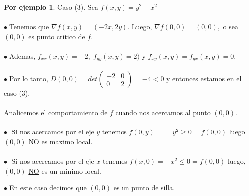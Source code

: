 \documentclass{article}
\theoremstyle{definition}
\newtheorem*{ej}{Por ejemplo}
\theoremstyle{remark}
\newcommand\bl{$\bullet\;$}
\begin{document}
\begin{ej} Caso \textcolor{rojop2}{(3)}. Sea $f(x,y)=y^2-x^2$\\\\
  \bl Tenemos que $\nabla f(x,y)=(-2x,2y)$. Luego, $\nabla f (0,0)=(0,0),$ o sea $(0,0)$ es punto critico de $f$. \\\\
   \bl Ademas, $f_{xx}(x,y)=-2, \; f_{yy}(x,y)=2)$ \; y \; $f_{xy}(x,y)=f_{yx}(x,y)=0$. \\\\
   \bl Por lo tanto, $D(0,0)=det\left(\begin{array}{rl}
       -2 & 0 \\
       0 & 2
   \end{array}\right)=-4<0$ y entonces estamos en el caso \textcolor{rojop2}{(3)}. \\\\
   Analicemos el comportamiento de $f$ cuando nos acercamos al punto $(0,0)$.\\\\
   \textcolor{verdep2}{\bl} Si nos acercamos por el eje $y$ tenemos $f(0,y)=\phantom{-}y^2\geq0=f(0,0)$ luego $(0,0)$ \underline{NO} es maximo local.\\\\
   \textcolor{rojop2}{\bl} Si nos acercamos por el eje $x$ tenemos $f(x,0)=-x^2\leq0=f(0,0)$ luego, $(0,0)$ \underline{NO} es un minimo local.
\end{ej}
  \begin{figure}[h]
\centering
\def\svgwidth{0.55\textwidth}
\makebox[\textwidth]{
}
\end{figure} 
\bl En este caso decimos que $(0,0)$ es un punto de silla.
\end{document}
